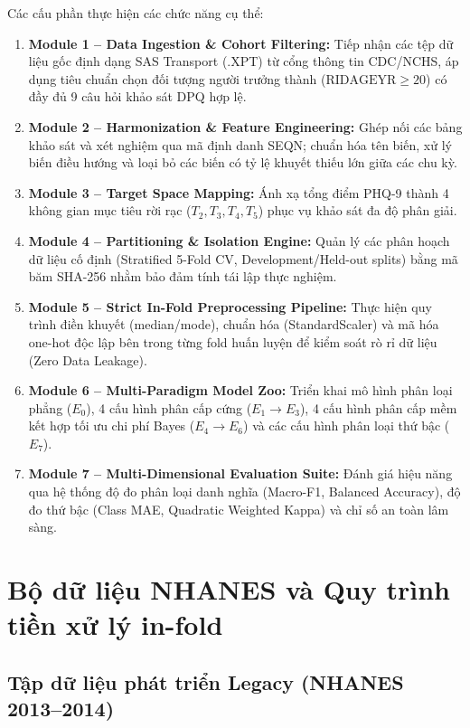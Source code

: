 Các cấu phần thực hiện các chức năng cụ thể:
\begin{enumerate}
    \item \textbf{Module 1 -- Data Ingestion \& Cohort Filtering:} Tiếp nhận các tệp dữ liệu gốc định dạng SAS Transport (.XPT) từ cổng thông tin CDC/NCHS, áp dụng tiêu chuẩn chọn đối tượng người trưởng thành ($\text{RIDAGEYR} \ge 20$) có đầy đủ 9 câu hỏi khảo sát DPQ hợp lệ.
    \item \textbf{Module 2 -- Harmonization \& Feature Engineering:} Ghép nối các bảng khảo sát và xét nghiệm qua mã định danh SEQN; chuẩn hóa tên biến, xử lý biến điều hướng và loại bỏ các biến có tỷ lệ khuyết thiếu lớn giữa các chu kỳ.
    \item \textbf{Module 3 -- Target Space Mapping:} Ánh xạ tổng điểm PHQ-9 thành 4 không gian mục tiêu rời rạc ($T_2, T_3, T_4, T_5$) phục vụ khảo sát đa độ phân giải.
    \item \textbf{Module 4 -- Partitioning \& Isolation Engine:} Quản lý các phân hoạch dữ liệu cố định (Stratified 5-Fold CV, Development/Held-out splits) bằng mã băm SHA-256 nhằm bảo đảm tính tái lập thực nghiệm.
    \item \textbf{Module 5 -- Strict In-Fold Preprocessing Pipeline:} Thực hiện quy trình điền khuyết (median/mode), chuẩn hóa (StandardScaler) và mã hóa one-hot độc lập bên trong từng fold huấn luyện để kiểm soát rò rỉ dữ liệu (Zero Data Leakage).
    \item \textbf{Module 6 -- Multi-Paradigm Model Zoo:} Triển khai mô hình phân loại phẳng ($E_0$), 4 cấu hình phân cấp cứng ($E_1 \to E_3$), 4 cấu hình phân cấp mềm kết hợp tối ưu chi phí Bayes ($E_4 \to E_6$) và các cấu hình phân loại thứ bậc ($E_7$).
    \item \textbf{Module 7 -- Multi-Dimensional Evaluation Suite:} Đánh giá hiệu năng qua hệ thống độ đo phân loại danh nghĩa (Macro-F1, Balanced Accuracy), độ đo thứ bậc (Class MAE, Quadratic Weighted Kappa) và chỉ số an toàn lâm sàng.
\end{enumerate}

\section{Bộ dữ liệu NHANES và Quy trình tiền xử lý in-fold}
\label{sec:du-lieu-nghien-cuu}

\subsection{Tập dữ liệu phát triển Legacy (NHANES 2013--2014)}
\label{subsec:legacy-cohort}

